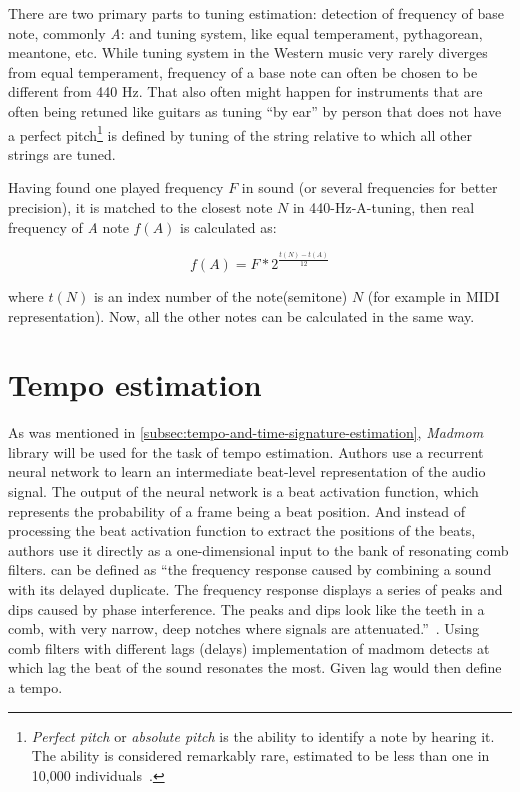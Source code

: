 There are two primary parts to tuning estimation: detection of frequency of base note, commonly \textit{A}:
and tuning system, like equal temperament, pythagorean, meantone, etc. While tuning system in the Western music very
rarely diverges from equal temperament, frequency of a base note can often be chosen to be different from 440 Hz. That
also often might happen for instruments that are often being retuned like guitars as tuning ``by ear'' by person that
does not have a perfect pitch\footnote{\textit{Perfect pitch} or \textit{absolute pitch} is the ability to identify
a note by hearing it. The ability is considered remarkably rare, estimated to be less than one in 10,000
individuals~\cite{perfect-pitch}.} is defined by tuning of the string relative to which all other strings are tuned.

Having found one played frequency $F$ in sound (or several frequencies for better precision), it is matched to
the closest note $N$ in 440-Hz-A-tuning, then real frequency of \textit{A} note $f(A)$ is calculated as:

\[ f(A) = F * 2^\frac{t(N)-t(A)}{12} \]

where $t(N)$ is an index number of the note(semitone) $N$ (for example in \ac{MIDI} representation). Now, all the other
notes can be calculated in the same way.

\section{Tempo estimation}\label{sec:tempo-estimation}
As was mentioned in \cref{subsec:tempo-and-time-signature-estimation}, \textit{Madmom} library will be used for
the task of tempo estimation. Authors use a recurrent neural network to learn an intermediate beat-level representation
of the audio signal. The output of the neural network is a beat activation function, which represents the probability of
a frame being a beat position. And instead of processing the beat activation function to extract the positions of
the beats, authors use it directly as a one-dimensional input to the bank of resonating comb filters.  can be defined as ``the frequency response caused by combining a sound with its delayed duplicate.
The frequency response displays a series of peaks and dips caused by phase interference. The peaks and dips look like
the teeth in a comb, with very narrow, deep notches where signals are attenuated.''~\cite{comb-filter}. Using comb
filters with different lags (delays) implementation of madmom detects at which lag the beat of the sound resonates
the most. Given lag would then define a tempo.

